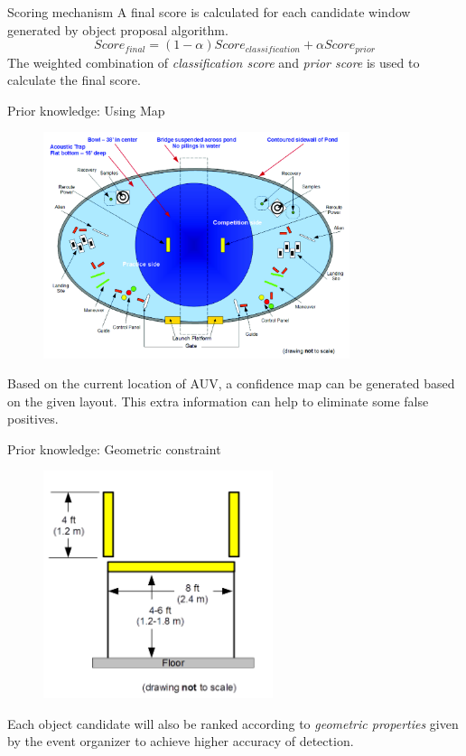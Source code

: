 \documentclass[13pt]{beamer}
\begin{document}
\begin{frame}{Scoring mechanism}
  A final score is calculated for each candidate window generated by object
  proposal algorithm.
  \[
    Score_{final} = (1 - \alpha) Score_{classification} + \alpha Score_{prior}
  \]
  The weighted combination of \textit{classification score} and \textit{prior
    score} is used to calculate the final score.
\end{frame}

\begin{frame}{Prior knowledge: Using Map}

  \begin{figure}[ht]
      \centering
      \includegraphics[width=0.8\textwidth, height=0.4\textwidth]{figs/map.jpg}
  \end{figure}

  Based on the current location of AUV, a confidence map can be generated based
  on the given layout. This extra information can help to eliminate some false
  positives.
\end{frame}

\begin{frame}{Prior knowledge: Geometric constraint}

  \begin{figure}[ht]
      \centering
      \includegraphics[width=0.6\textwidth, height=0.4\textwidth]{figs/geometric.png}
  \end{figure}

  Each object candidate will also be ranked according to \textit{geometric
    properties} given by the event organizer to achieve higher accuracy of detection.

\end{frame}
\end{document}

